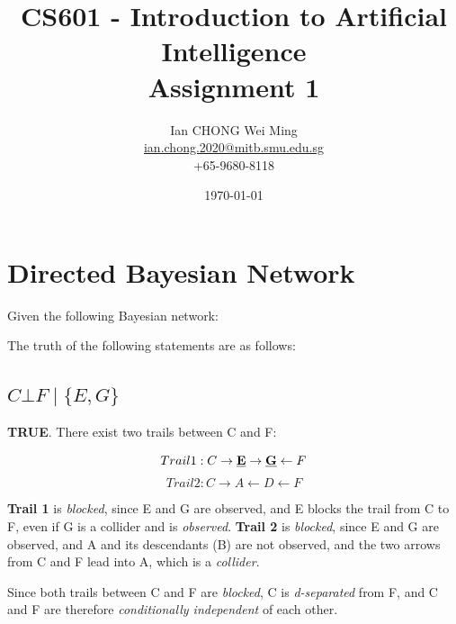 \documentclass[12pt, letterpaper]{article}
\title{CS601 - Introduction to Artificial Intelligence\\Assignment 1}
\author{Ian CHONG Wei Ming
\\\href{mailto:ian.chong.2020@mitb.smu.edu.sg}{ian.chong.2020@mitb.smu.edu.sg}
\\+65-9680-8118}
\date{\today}
\begin{document}
\maketitle

\section{Directed Bayesian Network}

Given the following Bayesian network:

\begin{center}
\end{center}

The truth of the following statements are as follows:

\subsection{\(C\bot F\mid \{E,G\}\)}
\textbf{TRUE}. There exist two trails between C and F:

\[Trail 1: C \rightarrow \textbf{\underline{E}} \rightarrow \textbf{\underline{G}} \leftarrow F\]
\[Trail 2: C \rightarrow A \leftarrow D \leftarrow F\]

\textbf{Trail 1} is \textit{blocked}, since E and G are observed, and E blocks the trail from C to F, even if G is a collider and is \textit{observed}. 
\textbf{Trail 2} is \textit{blocked}, since E and G are observed, and A and its descendants (B) are not observed, and the two  arrows from C and F lead into A, which is a \textit{collider}. 

Since both trails between C and F are \textit{blocked}, C is \emph{d-separated} from F, and C and F are therefore \textit{conditionally independent} of each other.
\end{document}
